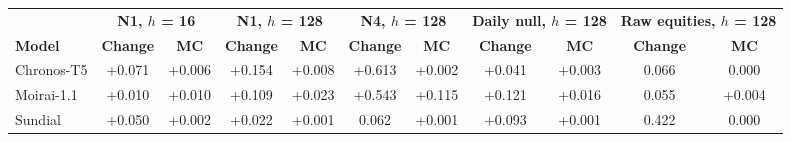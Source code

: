 \begin{tabular}{@{}lcccccccccc@{}}
\toprule
 & \multicolumn{2}{c}{\textbf{N1, $h$ = 16}} & \multicolumn{2}{c}{\textbf{N1, $h$ = 128}} & \multicolumn{2}{c}{\textbf{N4, $h$ = 128}} & \multicolumn{2}{c}{\textbf{Daily null, $h$ = 128}} & \multicolumn{2}{c}{\textbf{Raw equities, $h$ = 128}} \\
\cmidrule(lr){2-3}\cmidrule(lr){4-5}\cmidrule(lr){6-7}\cmidrule(lr){8-9}\cmidrule(lr){10-11}
\textbf{Model} & \textbf{Change} & \textbf{MC} & \textbf{Change} & \textbf{MC} & \textbf{Change} & \textbf{MC} & \textbf{Change} & \textbf{MC} & \textbf{Change} & \textbf{MC} \\
\midrule
Chronos-T5 & +0.071 & +0.006 & +0.154 & +0.008 & +0.613 & +0.002 & +0.041 & +0.003 & \textminus{}0.066 & 0.000 \\
Moirai-1.1 & +0.010 & +0.010 & +0.109 & +0.023 & +0.543 & +0.115 & +0.121 & +0.016 & \textminus{}0.055 & +0.004 \\
Sundial & +0.050 & +0.002 & +0.022 & +0.001 & \textminus{}0.062 & +0.001 & +0.093 & +0.001 & \textminus{}0.422 & 0.000 \\
\bottomrule
\end{tabular}
